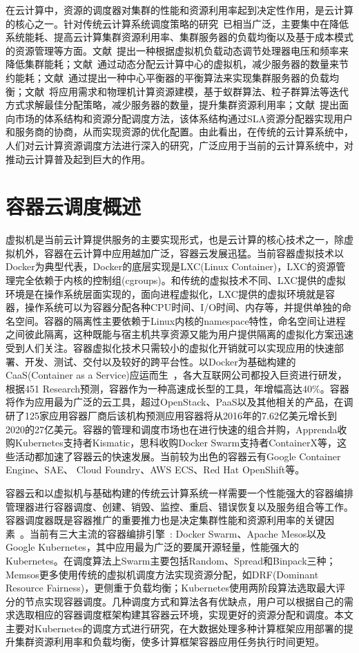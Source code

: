 在云计算中，资源的调度器对集群的性能和资源利用率起到决定性作用，是云计算的核心之一。针对传统云计算系统调度策略的研究~\cite{CloudSummarize}已相当广泛，主要集中在降低系统能耗、提高云计算集群资源利用率、集群服务器的负载均衡以及基于成本模式的资源管理等方面。文献~提出一种根据虚拟机负载动态调节处理器电压和频率来降低集群能耗；文献~通过动态分配云计算中心的虚拟机，减少服务器的数量来节约能耗；文献~通过提出一种中心平衡器的平衡算法来实现集群服务器的负载均衡；文献~将应用需求和物理机计算资源建模，基于蚁群算法、粒子群算法等迭代方式求解最佳分配策略，减少服务器的数量，提升集群资源利用率；文献~提出面向市场的体系结构和资源分配调度方法，该体系结构通过SLA资源分配器实现用户和服务商的协商，从而实现资源的优化配置。由此看出，在传统的云计算系统中，人们对云计算资源调度方法进行深入的研究，广泛应用于当前的云计算系统中，对推动云计算普及起到巨大的作用。

\section{容器云调度概述}
虚拟机是当前云计算提供服务的主要实现形式，也是云计算的核心技术之一，除虚拟机外，容器在云计算中应用越加广泛，容器云发展迅猛。当前容器虚拟技术以Docker为典型代表，Docker的底层实现是LXC(Linux Container)，LXC的资源管理完全依赖于内核的控制组(cgroups)。和传统的虚拟技术不同、LXC提供的虚拟环境是在操作系统层面实现的，面向进程虚拟化，LXC提供的虚拟环境就是容器，操作系统可以为容器分配各种CPU时间、I/O时间、内存等，并提供单独的命名空间。容器的隔离性主要依赖于Linux内核的namespace特性，命名空间让进程之间彼此隔离，这种既能与宿主机共享资源又能为用户提供隔离的虚拟化方案迅速受到人们关注。容器虚拟化技术只需较小的虚拟化开销就可以实现应用的快速部署、开发、测试、交付以及较好的跨平台性。以Docker为基础构建的CaaS(Container as a Service)应运而生~\cite{Kozhirbayev2017A}，各大互联网公司都投入巨资进行研发，根据451 Research预测，容器作为一种高速成长型的工具，年增幅高达40\%。容器将作为应用最为广泛的云工具，超过OpenStack、PaaS以及其他相关的产品，在调研了125家应用容器厂商后该机构预测应用容器将从2016年的7.62亿美元增长到2020的27亿美元。容器的管理和调度市场也在进行快速的组合并购，Apprenda收购Kubernetes支持者Kismatic，思科收购Docker Swarm支持者ContainerX等，这些活动都加速了容器云的快速发展。当前较为出色的容器云有Google Container Engine、SAE、 Cloud Foundry、AWS ECS、Red Hat OpenShift等。

容器云和以虚拟机与基础构建的传统云计算系统一样需要一个性能强大的容器编排管理器进行容器调度、创建、销毁、监控、重启、错误恢复以及服务组合等工作。容器调度器既是容器推广的重要推力也是决定集群性能和资源利用率的关键因素~\cite{Application2017}。当前有三大主流的容器编排引擎~\cite{Usman2016}: Docker Swarm、Apache Mesos以及Google Kubernetes，其中应用最为广泛的要属开源轻量，性能强大的Kubernetes。在调度算法上Swarm主要包括Random、Spread和Binpack三种；Memsos更多使用传统的虚拟机调度方法实现资源分配，如DRF(Dominant Resource Fairness)，更侧重于负载均衡；Kubernetes使用两阶段算法选取最大评分的节点实现容器调度。几种调度方式和算法各有优缺点，用户可以根据自己的需求选取相应的容器调度框架构建其容器云环境，实现更好的资源分配和调度。本文主要对Kubernetes的调度方式进行研究，在大数据处理多种计算框架应用部署的提升集群资源利用率和负载均衡，使多计算框架容器应用任务执行时间更短。

